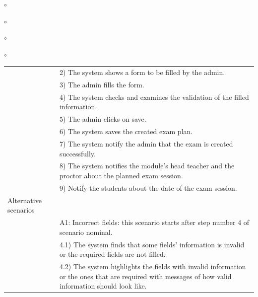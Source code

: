 \documentclass[]{uc2pfecaneva}
\begin{document}
\begin{list}{$\circ$}{}
\begin{list}{$\circ$}{}
\begin{list}{$\circ$}{}
\begin{list}{$\circ$}{}
\begin{table}[t]
\begin{tabularx}{\textwidth}{|l|X|}
            & 2) The system shows a form to be filled by the admin.                                                                                                             \\
            & 3) The admin fills the form.                                                                                                                                      \\
            & 4) The system checks and examines the validation of the filled information.                                                                                       \\
            & 5) The admin clicks on save.                                                                                                                                      \\
            & 6) The system saves the created exam plan.                                                                                                                     \\
            & 7) The system notify the admin that the exam is created successfully.                                                                                             \\
            & 8) The system notifies the module's head teacher and the proctor about the planned exam session.                                                                                 \\
            & 9) Notify the students about the date of the exam session.                                                                                                        \\ \hline
            Alternative scenarios &                                                                                                                                                                   \\
            & A1: Incorrect fields: this scenario starts after step number 4 of scenario nominal.                                                                               \\
            & \hspace{4mm}4.1) The system finds that some fields' information is invalid or the required fields are not filled.                                                 \\
            & \hspace{4mm}4.2) The system highlights the fields with invalid information or the ones that are required with messages of how valid information should look like. \\

\end{tabularx}
\end{table}
\end{list}
\end{list}
\end{list}
\end{list}
\end{document}

